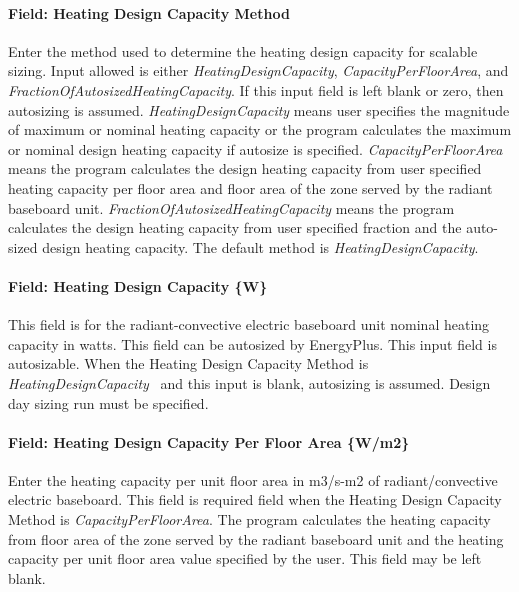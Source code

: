 \paragraph{Field: Heating Design Capacity Method}\label{field-heating-design-capacity-method-2}

Enter the method used to determine the heating design capacity for scalable sizing. Input allowed is either \emph{HeatingDesignCapacity}, \emph{CapacityPerFloorArea}, and \emph{FractionOfAutosizedHeatingCapacity}. If this input field is left blank or zero, then autosizing is assumed. \emph{HeatingDesignCapacity} means user specifies the magnitude of maximum or nominal heating capacity or the program calculates the maximum or nominal design heating capacity if autosize is specified. \emph{CapacityPerFloorArea} means the program calculates the design heating capacity from user specified heating capacity per floor area and floor area of the zone served by the radiant baseboard unit. \emph{FractionOfAutosizedHeatingCapacity} means the program calculates the design heating capacity from user specified fraction and the auto-sized design heating capacity. The default method is \emph{HeatingDesignCapacity}.

\paragraph{Field: Heating Design Capacity \{W\}}\label{field-heating-design-capacity-w-2}

This field is for the radiant-convective electric baseboard unit nominal heating capacity in watts. This field can be autosized by EnergyPlus. This input field is autosizable. When the Heating Design Capacity Method is \emph{HeatingDesignCapacity}~ and this input is blank, autosizing is assumed. Design day sizing run must be specified.

\paragraph{Field: Heating Design Capacity Per Floor Area \{W/m2\}}\label{field-heating-design-capacity-per-floor-area-wm2-2}

Enter the heating capacity per unit floor area in m3/s-m2 of radiant/convective electric baseboard. This field is required field when the Heating Design Capacity Method is \emph{CapacityPerFloorArea}. The program calculates the heating capacity from floor area of the zone served by the radiant baseboard unit and the heating capacity per unit floor area value specified by the user. This field may be left blank.

